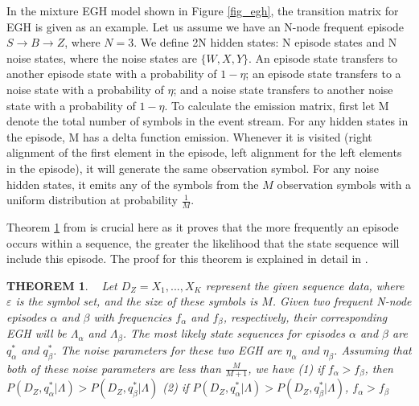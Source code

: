 In the mixture EGH model shown in Figure \ref{fig_egh}, 
the transition matrix for EGH is given as an example. 
Let us assume we have an N-node frequent episode $S\rightarrow B\rightarrow Z$, where $N=3$.
We define 2N hidden states: 
N episode states and N noise states, where
the noise states are $\{W, X, Y\}$. 
An episode state transfers to another episode state 
with a probability of $1-\eta$; 
an episode state transfers to a noise state 
with a probability of $\eta$; 
and a noise state transfers to another noise state 
with a probability of $1-\eta$. 
To calculate the emission matrix, first 
let M denote the total number of symbols in the event stream. 
For any hidden states in the episode, M has a delta function emission. 
Whenever it is visited (right alignment of the first element in the episode, 
left alignment for the left elements in the episode), 
it will generate the same observation symbol. 
For any noise hidden states, it emits any of the symbols from the $M$ 
observation symbols with a uniform distribution at probability $\frac{1}{M}$. 


Theorem \ref{theorem1} from \cite{laxman2008stream} is crucial here as it
proves that the more frequently an episode occurs within a sequence, 
the greater the likelihood that the state sequence will include this episode. 
The proof for this theorem is explained in detail in \cite{laxman2008stream}. 


\newtheorem{mydef}{THEOREM}
\begin{mydef}
\label{theorem1}~\cite{laxman2008stream} 
Let $D_Z={X_1,..., X_K}$ represent the given sequence data, where $\varepsilon$ is the symbol set, 
and the size of these symbols is $M$. 
Given two frequent N-node episodes $\alpha$ and $\beta$ with frequencies $f_{\alpha}$ 
and $f_{\beta}$, respectively, their corresponding EGH will be $\Lambda_{\alpha}$ and $\Lambda_{\beta}$. 
The most likely state sequences for episodes $\alpha$ and $\beta$ are
$q_{\alpha}^*$ and $q_{\beta}^*$. 
The noise parameters for these two EGH are 
$\eta_{\alpha}$ and $\eta_{\beta}$. 
Assuming that both of these noise parameters are less than $\frac{M}{M+1}$, 
we have 
(1) if $f_{\alpha} > f_{\beta}$, then $P(D_Z, q_{\alpha}^*| \Lambda) > P(D_Z, q_{\beta}^*| \Lambda)  $
(2) if $P(D_Z, q_{\alpha}^*| \Lambda) > P(D_Z, q_{\beta}^*| \Lambda)  $, $f_{\alpha} > f_{\beta}$
\end{mydef}

